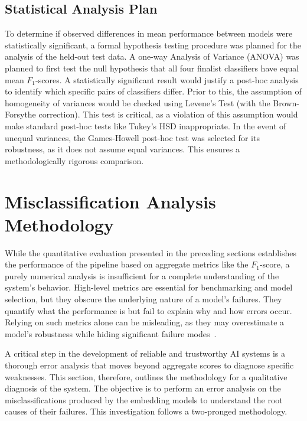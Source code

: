 \subsection{Statistical Analysis Plan}\label{ch:3.4.3}
To determine if observed differences in mean performance between models were statistically significant, a formal hypothesis testing procedure was planned for the analysis of the held-out test data.
A one-way Analysis of Variance (ANOVA) was planned to first test the null hypothesis that all four finalist classifiers have equal mean \(F_1\)-scores. A statistically significant result would justify a post-hoc analysis to identify which specific pairs of classifiers differ. Prior to this, the assumption of homogeneity of variances would be checked using Levene's Test (with the Brown-Forsythe correction). This test is critical, as a violation of this assumption would make standard post-hoc tests like Tukey's HSD inappropriate. In the event of unequal variances, the Games-Howell post-hoc test was selected for its robustness, as it does not assume equal variances. This ensures a methodologically rigorous comparison.

\section{Misclassification Analysis Methodology}\label{ch:3.5}
While the quantitative evaluation presented in the preceding sections establishes the performance of the pipeline based on aggregate metrics like the \(F_1\)-score, a purely numerical analysis is insufficient for a complete understanding of the system's behavior. High-level metrics are essential for benchmarking and model selection, but they obscure the underlying nature of a model's failures. They quantify what the performance is but fail to explain why and how errors occur. Relying on such metrics alone can be misleading, as they may overestimate a model's robustness while hiding significant failure modes~\cite{gauthier2022}.

A critical step in the development of reliable and trustworthy AI systems is a thorough error analysis that moves beyond aggregate scores to diagnose specific weaknesses. This section, therefore, outlines the methodology for a qualitative diagnosis of the system. The objective is to perform an error analysis on the misclassifications produced by the embedding models to understand the root causes of their failures. This investigation follows a two-pronged methodology.

